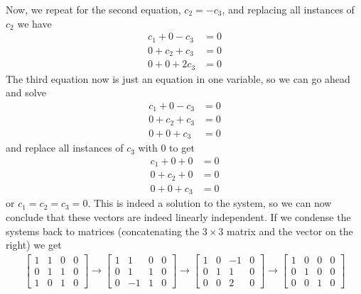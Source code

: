 Now, we repeat for the second equation, $c_2=-c_3$, and replacing all instances of $c_2$ we have \begin{align*}
	c_1 + 0 - c_3 &= 0 \\
	0 +  c_2 +  c_3 &= 0\\
	0 + 0 + 2c_3 &= 0
\end{align*}
The third equation now is just an equation in one variable, so we can go ahead and solve \begin{align*}
	c_1 + 0 - c_3 &= 0 \\
	0 +  c_2 +  c_3 &= 0\\
	0 + 0 + c_3 &= 0
\end{align*}
and replace all instances of $c_3$ with $0$ to get 
\begin{align*}
	c_1 + 0 + 0 &= 0 \\
	0 +  c_2+  0 &= 0\\
	0 + 0 + c_3 &= 0
\end{align*}
or $c_1=c_2=c_3=0$. This is indeed a solution to the system, so we can now conclude that these vectors are indeed linearly independent.
If we condense the systems back to matrices (concatenating the $3\times 3$ matrix and the vector on the right)  we get 
\begin{align*}
	\left[
	\begin{array}{ccc|c}
		1&1&0&0\\
		0&1&1&0\\
		1&0&1&0
	\end{array} \right] \rightarrow
	\left[\begin{array}{ccc|c}
		1&1&0&0\\
		0&1&1&0\\
		0&-1&1&0
	\end{array}\right] \rightarrow
	\left[\begin{array}{ccc|c}
		1&0&-1&0\\
		0&1&1&0\\
		0&0&2&0
	\end{array}\right]
	\rightarrow
	\left[\begin{array}{ccc|c}
		1&0&0&0\\
		0&1&0&0\\
		0&0&1&0
	\end{array}\right]
\end{align*}
